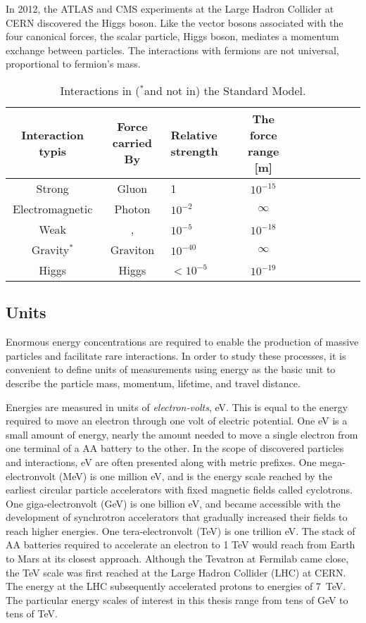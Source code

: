 In 2012, the ATLAS and CMS experiments at the Large Hadron Collider at CERN discovered the Higgs boson. Like the vector bosons associated with the four canonical forces, the scalar particle, Higgs boson, mediates a momentum exchange between particles. The interactions with fermions are not universal, proportional to fermion's mass.

\begin{table}[htp]
\begin{center}
\caption{Interactions in ($^*$and not in) the Standard Model. \cite{robinson}}
{\footnotesize
\begin{tabular}{c c l c c c c c c c}
\toprule
Interaction typis      & Force carried By &  Relative strength   & The force range [m]  \\
\midrule
Strong           & Gluon      &  1          & $10^{-15}$ \\
Electromagnetic  & Photon     &  $10^{-2}$  & $\infty$   \\
Weak             & \W, \Z     &  $10^{-5}$  & $10^{-18}$ \\
Gravity$^*$      & Graviton   &  $10^{-40}$ & $\infty$   \\
Higgs            & Higgs      &  $< 10^{-5}$ &   $10^{-19}$ \\
\bottomrule      
\end{tabular}
}
\label{tab:forces}
\end{center}
\end{table}

\subsection{Units}

Enormous energy concentrations are required to enable the production of massive particles and facilitate rare interactions.
In order to study these processes, it is convenient to define units of measurements using energy as the basic unit to describe the particle mass, momentum, lifetime, and travel distance.

Energies are measured in units of \emph{electron-volts}, eV.
This is equal to the energy required to move an electron through one volt of electric potential.
One eV is a small amount of energy, nearly the amount needed to move a single electron from one terminal of a AA battery to the other.
In the scope of discovered particles and interactions, eV are often presented along with metric prefixes.
One mega-electronvolt (MeV) is one million eV, and is the energy scale reached by the earliest circular particle accelerators with fixed magnetic fields called cyclotrons. 
One giga-electronvolt (GeV) is one billion eV, and became accessible with the development of synchrotron accelerators that gradually increased their fields to reach higher energies.
One tera-electronvolt (TeV) is one trillion eV.
The stack of AA batteries required to accelerate an electron to 1 TeV would reach from Earth to Mars at its closest approach.
Although the Tevatron at Fermilab came close, the TeV scale was first reached at the Large Hadron Collider (LHC) at CERN.
The energy at the LHC subsequently accelerated protons to energies of 7~TeV.
The particular energy scales of interest in this thesis range from tens of GeV to tens of TeV.

